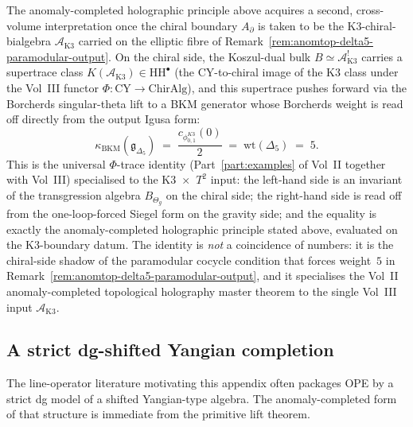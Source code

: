 \begin{remark}
\label{rem:anomtop-phi-trace-k3xt2}
The anomaly-completed holographic principle above acquires a
second, cross-volume interpretation once the chiral boundary
$A_{\partial}$ is taken to be the K3-chiral-bialgebra
$\mathcal A_{\mathrm{K3}}$ carried on the elliptic fibre of
Remark~\ref{rem:anomtop-delta5-paramodular-output}.
On the chiral side, the Koszul-dual bulk
$B\simeq\mathcal A_{\mathrm{K3}}^{!}$ carries a supertrace
class
$K(\mathcal A_{\mathrm{K3}})\in \mathrm{HH}^{\bullet}$
(the CY-to-chiral image of the K3 class under the Vol~III functor
$\Phi\colon\mathrm{CY}\to\mathrm{ChirAlg}$), and this
supertrace pushes forward via the Borcherds singular-theta
lift to a BKM generator whose Borcherds weight is read off
directly from the output Igusa form:
\[
\kappa_{\mathrm{BKM}}(\mathfrak g_{\Delta_{5}})
\;=\;
\frac{c_{\phi_{0,1}^{K3}}(0)}{2}
\;=\;
\mathrm{wt}(\Delta_{5})
\;=\;
5.
\]
This is the universal $\Phi$-trace identity
(Part~\ref{part:examples} of Vol~II together with Vol~III)
specialised to the K3~$\times$~$T^{2}$ input: the left-hand
side is an invariant of the transgression algebra
$B_{\Theta_{g}}$ on the chiral side; the right-hand side is
read off from the one-loop-forced Siegel form on the gravity
side; and the equality is exactly the anomaly-completed
holographic principle stated above, evaluated on the
K3-boundary datum.
The identity is \emph{not} a coincidence of numbers: it is
the chiral-side shadow of the paramodular cocycle condition
that forces weight~$5$ in
Remark~\ref{rem:anomtop-delta5-paramodular-output}, and
it specialises the Vol~II anomaly-completed topological
holography master theorem to the single Vol~III input
$\mathcal A_{\mathrm{K3}}$.
\end{remark}

\subsection{A strict dg-shifted Yangian completion}

The line-operator literature motivating this appendix often packages OPE by a strict dg model of a shifted Yangian-type algebra.
The anomaly-completed form of that structure is immediate from the primitive lift theorem.

